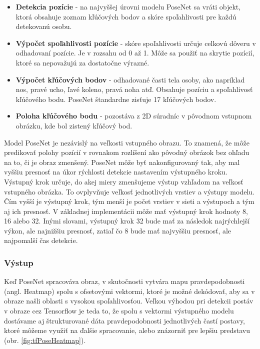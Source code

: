 \documentclass[slovak,master,dept460,male,cpp,cpdeclaration]{diploma}
\begin{document}
\begin{itemize}
\item \textbf{Detekcia pozície} - na najvyššej úrovni modelu PoseNet sa vráti objekt, ktorá obsahuje zoznam kľúčových bodov a skóre spoľahlivosti pre každú detekovanú osobu.
\item \textbf{Výpočet spoľahlivosti pozície} - skóre spoľahlivosti určuje celkovú dôveru v odhadovaní pozície. Je v rozsahu od 0 až 1. Môže sa použiť na skrytie pozícií, ktoré sa nepovažujú za dostatočne výrazné.
\item \textbf{Výpočet kľúčových bodov} - odhadované časti tela osoby, ako napríklad nos, pravé ucho, ľavé koleno, pravá noha atď. Obsahuje pozíciu a spoľahlivosť kľúčového bodu. PoseNet štandardne zisťuje 17 kľúčových bodov.
\item \textbf{Poloha kľúčového bodu} - pozostáva z 2D súradníc v pôvodnom vstupnom obrázku, kde bol zistený kľúčový bod.
\end{itemize}


Model PoseNet je nezávislý na veľkosti vstupného obrazu. To znamená, že môže predikovať polohy pozícií v rovnakom rozlíšení ako pôvodný obrázok bez ohľadu na to, či je obraz zmenšený. PoseNet môže byť nakonfigurovaný tak, aby mal vyššiu presnosť na úkor rýchlosti detekcie nastavením výstupného kroku. Výstupný krok určuje, do akej miery zmenšujeme výstup vzhľadom na veľkosť vstupného obrázka. To ovplyvňuje veľkosť jednotlivých vrstiev a výstupy modelu. Čím vyšší je výstupný krok, tým menší je počet vrstiev v sieti a výstupoch a tým aj ich presnosť. V základnej implementácii môže mať výstupný krok hodnoty 8, 16 alebo 32. Inými slovami, výstupný krok 32 bude mať za následok najrýchlejší výkon, ale najnižšiu presnosť, zatiaľ čo 8 bude mať najvyššiu presnosť, ale najpomalší čas detekcie.


\subsubsection{Výstup}
Keď PoseNet spracováva obraz, v skutočnosti vytvára mapu pravdepodobnosti (angl. Heatmap) spolu s ofsetovými vektormi, ktoré je možné dekódovať, aby sa v obraze našli oblasti s vysokou spoľahlivosťou. Veľkou výhodou pri detekcii postáv v obraze cez Tensorflow je teda to, že spolu s vektormi výstupného modelu dostávame aj štrukturované dáta pravdepodobnosti jednotlivých častí postavy, ktoré môžeme využiť na ďalšie spracovanie, alebo znázorniť pre lepšiu predstavu (obr. \ref{fig:tfPoseHeatmap}).
\end{document}
